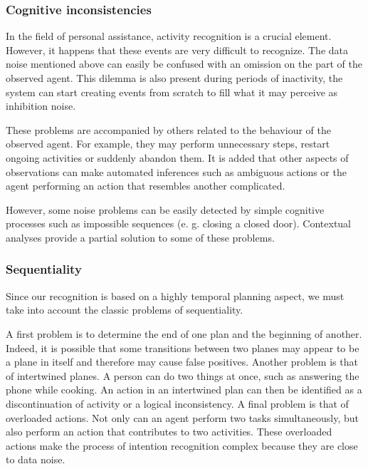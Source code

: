 \documentclass[11pt,a4paper,twoside,openright,titlepage,numbers=noenddot,headinclude,cleardoublepage=empty,openany]{scrreprt}
\theoremstyle{plain}
\theoremstyle{definition}
\theoremstyle{remark}
\begin{document}
\hypertarget{cognitive-inconsistencies}{%
\subsubsection{Cognitive
inconsistencies}\label{cognitive-inconsistencies}}

In the field of personal assistance, activity recognition is a crucial
element. However, it happens that these events are very difficult to
recognize. The data noise mentioned above can easily be confused with an
omission on the part of the observed agent. This dilemma is also present
during periods of inactivity, the system can start creating events from
scratch to fill what it may perceive as inhibition noise.

These problems are accompanied by others related to the behaviour of the
observed agent. For example, they may perform unnecessary steps, restart
ongoing activities or suddenly abandon them. It is added that other
aspects of observations can make automated inferences such as ambiguous
actions or the agent performing an action that resembles another
complicated.

However, some noise problems can be easily detected by simple cognitive
processes such as impossible sequences (e. g. closing a closed door).
Contextual analyses provide a partial solution to some of these
problems.

\hypertarget{sequentiality}{%
\subsubsection{Sequentiality}\label{sequentiality}}

Since our recognition is based on a highly temporal planning aspect, we
must take into account the classic problems of sequentiality.

A first problem is to determine the end of one plan and the beginning of
another. Indeed, it is possible that some transitions between two planes
may appear to be a plane in itself and therefore may cause false
positives. Another problem is that of intertwined planes. A person can
do two things at once, such as answering the phone while cooking. An
action in an intertwined plan can then be identified as a
discontinuation of activity or a logical inconsistency. A final problem
is that of overloaded actions. Not only can an agent perform two tasks
simultaneously, but also perform an action that contributes to two
activities. These overloaded actions make the process of intention
recognition complex because they are close to data noise.
\end{document}
